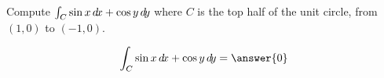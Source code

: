 \documentclass{ximera}
\author{David Guichard \and Neal Koblitz \and H. Jerome Keisler \and Albert Scheller \and Barry Balof \and Mike Wills \and Matthew Carr}
\begin{document}
\begin{exercise}




Compute $\int_C \sin x \mathop{}\!d\! x+\cos y \mathop{}\!d\! y$ where $C$ is the top half of the unit circle, from $(1,0)$ to $(-1,0)$.

\begin{prompt}
\[
\int_C \sin x \d x+\cos y \d y=\answer{0}
\]
\end{prompt}



\end{exercise}
\end{document}
